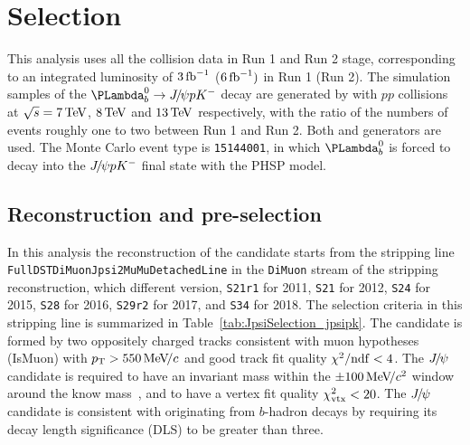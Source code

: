 \section{Selection}

This analysis uses all the \pp collision data in Run 1 and Run 2 stage, 
corresponding to an integrated luminosity of $3\text{\,fb}^{-1}$ ($6\text{\,fb}^{-1})$ in Run 1 (Run 2). 
The simulation samples of the $\Lb\to\jpsi\proton\Km$ decay are generated by \pythia with $pp$ collisions at $\sqrt{s}=7\text{\,Te\kern -0.1em V}$, $8\text{\,Te\kern -0.1em V}$ and $13\text{\,Te\kern -0.1em V}$ respectively,
with the ratio of the numbers of events roughly one to two between Run 1 and Run 2.
Both  and  generators are used.
The Monte Carlo event type is \texttt{15144001}, 
in which $\Lb$ is forced to decay into the ${{J\mskip -3mu/\mskip -2mu\psi}}{p}{{K}^-}$ final state with the PHSP model.

%
\subsection{Reconstruction and pre-selection}
In this analysis the reconstruction of the \Lb candidate starts
from the stripping line \texttt{FullDSTDiMuonJpsi2MuMuDetachedLine} in the \texttt{DiMuon} stream 
of the stripping reconstruction,
which different version, 
\texttt{S21r1} for 2011, 
\texttt{S21} for 2012, 
\texttt{S24} for 2015, 
\texttt{S28} for 2016, 
\texttt{S29r2} for 2017, 
and \texttt{S34} for 2018. 
The selection criteria in this stripping line is summarized in Table~\ref{tab:JpsiSelection_jpsipk}.
The \jpsi candidate is formed by two oppositely charged tracks consistent with muon hypotheses (IsMuon) 
with $p_{\mathrm{T}}>550\text{\,Me\kern -0.1em V\!/}c$ and good track fit quality $\chi^2/\mathrm{ndf}<4$.
The ${{J\mskip -3mu/\mskip -2mu\psi}}$ candidate is required to have an invariant mass within the $\pm100\text{\,Me\kern -0.1em V\!/}c^2$ window 
around the know \jpsi mass~\supercite{PDG2014}, and to have a vertex fit quality $\chi^2_{\text{vtx}}<20$.
The ${{J\mskip -3mu/\mskip -2mu\psi}}$ candidate is consistent with originating from $b$-hadron decays by requiring its decay length significance (DLS) to be greater than three.

